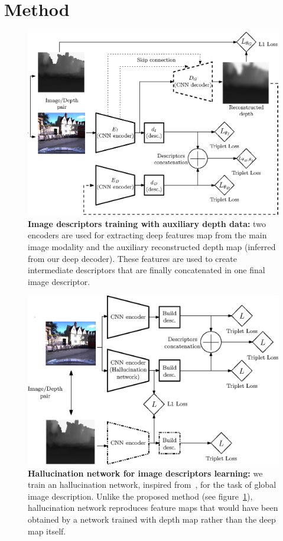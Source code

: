 \section{Method}
\label{sec:method}

\begin{figure}
	\center
	\includegraphics[width=\linewidth]{vect/our_method-inv}
	\caption{\label{fig:our_method} \textbf{Image descriptors training with auxiliary depth data:} two encoders are used for extracting deep features map from the main image modality and the auxiliary reconstructed depth map (inferred from our deep decoder). These features are used to create intermediate descriptors that are finally concatenated in one final image descriptor.}
\end{figure}

\begin{figure}
	\center
	\includegraphics[width=\linewidth]{vect/hall_method-inv}
	\caption{\label{fig:hall_method} \textbf{Hallucination network for image descriptors learning:} we train an hallucination network, inspired from~\cite{Hoffman2016}, for the task of global image description. Unlike the proposed method (see figure~\ref{fig:our_method}), hallucination network reproduces feature maps that would have been obtained by a network trained with depth map rather than the deep map itself.}
\end{figure}

